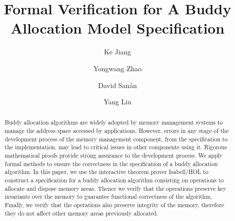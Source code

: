 \documentclass[runningheads]{llncs}
\begin{document}
\title{Formal Verification for A Buddy Allocation Model Specification}

\author{Ke Jiang \and
		Yongwang Zhao \and
		David San\'{a}n \and
		Yang Liu}



\maketitle


\begin{abstract}
Buddy allocation algorithms are widely adopted by memory management systems to manage the address space accessed by applications. However, errors in any stage of the development process of the memory management component, from the specification to the implementation, may lead to critical issues in other components using it. Rigorous mathematical proofs provide strong assurance to the development process. We apply formal methods to ensure the correctness in the specification of a buddy allocation algorithm. In this paper, we use the interactive theorem prover Isabell/HOL to construct a specification for a buddy allocation algorithm consisting on operations to allocate and dispose memory areas. Thence we verify that the operations preserve key invariants over the memory to guarantee functional correctness of the algorithm. Finally, we verify that the operations also preserve integrity of the memory, therefore they do not affect other memory areas previously allocated.

\end{abstract}







\end{document}
